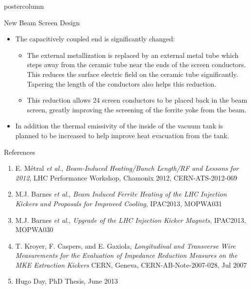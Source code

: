 \documentclass[final,hyperref={pdfpagelabels=false}]{beamer}
\begin{document}
\begin{frame}
\begin{columns}
\begin{column}{.49\textwidth}
\begin{beamercolorbox}[center,wd=\textwidth]{postercolumn}
\begin{minipage}[T]{.95\textwidth}
{\begin{block}{New Beam Screen Design}
{\begin{itemize}
\item{The capacitively coupled end is significantly changed:}
\begin{itemize}
\item{The external metallization is replaced by an external metal tube which steps away from the ceramic tube near the ends of the screen conductors. This reduces the surface electric field on the ceramic tube significantly. Tapering the length of the conductors also helps this reduction.}
\item{This reduction allows 24 screen conductors to be placed back in the beam screen, greatly improving the screening of the ferrite yoke from the beam.}
\end{itemize}
\item{In addition the thermal emissivity of the inside of the vacuum tank is planned to be increased to help improve heat evacuation from the tank.}
\end{itemize}
}
\end{block}
            \vfill

\vfill
\begin{block}{References}
\begin{enumerate}
\item{\small{E. Métral \emph{et al}., \emph{Beam-Induced Heating/Bunch Length/RF and Lessons for 2012}, LHC Performance Workshop, Chamonix 2012, CERN-ATS-2012-069}}
\item{\small{M.J. Barnes \emph{et al}., \emph{Beam Induced Ferrite Heating of the LHC Injection Kickers and Proposals for Improved Cooling}, IPAC2013, MOPWA031}}
\item{\small{M.J. Barnes \emph{et al}., \emph{Upgrade of the LHC Injection Kicker Magnets}, IPAC2013, MOPWA030}}
\item{\small{T. Kroyer, F. Caspers, and E. Gaxiola, \emph{Longitudinal and Transverse Wire Measurements for the Evaluation of Impedance Reduction Measures on the MKE Extraction Kickers} CERN, Geneva, CERN-AB-Note-2007-028, Jul 2007}}
\item{\small{Hugo Day, PhD Thesis, June 2013}}
\end{enumerate}
\end{block}
         \vfill
          }
        \end{minipage}
      \end{beamercolorbox}
    \end{column}


\end{columns}
\end{frame}
\end{document}
